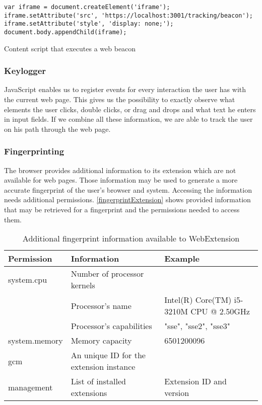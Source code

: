 			\begin{code}
				\begin{lstlisting}
var iframe = document.createElement('iframe');
iframe.setAttribute('src', 'https://localhost:3001/tracking/beacon');
iframe.setAttribute('style', 'display: none;');
document.body.appendChild(iframe);\end{lstlisting}
				\caption{Content script that executes a web beacon}
				\label{contentScriptWebBeacon}
			\end{code}
		
		\subsubsection{Keylogger} 
		
			JavaScript enables us to register events for every interaction the user has with the current web page. This gives us the possibility to exactly observe what elements the user clicks, double clicks, or drag and drops and what text he enters in input fields. If we combine all these information, we are able to track the user on his path through the web page. 
		
		\subsubsection{Fingerprinting} 
			
			The browser provides additional information to its extension which are not available for web pages. Those information may be used to generate a more accurate fingerprint of the user's browser and system. Accessing the information needs additional permissions. \autoref{fingerprintExtension} shows provided information that may be retrieved for a fingerprint and the permissions needed to access them. \\
		
			\begin{table}[h]
				\begin{tabular}{|l|l|l|} \hline
					\textbf{Permission} & \textbf{Information} & \textbf{Example} \\ \hline
					system.cpu & Number of processor kernels & \\
					& Processor's name & Intel(R) Core(TM) i5-3210M CPU @ 2.50GHz \\
					& Processor's capabilities & "sse", "sse2", "sse3"  \\ \hline
					system.memory & Memory capacity & 6501200096 \\ \hline
					gcm & An unique ID for the extension instance & \\ \hline
					management & List of installed extensions & Extension ID and version \\ \hline
				\end{tabular}
				\caption{Additional fingerprint information available to WebExtension}
				\label{fingerprintExtension}
			\end{table} 


